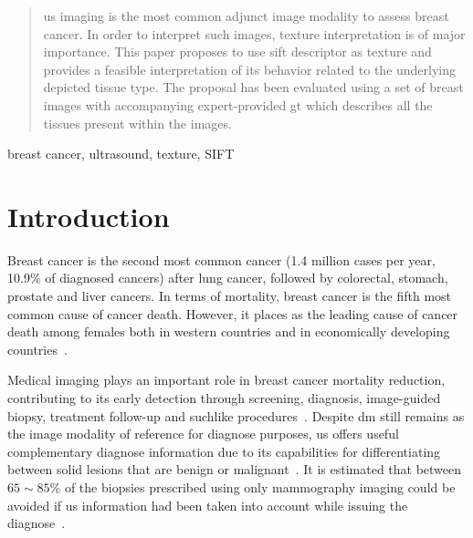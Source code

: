 \documentclass[a4paper, 10pt, conference]{llncs}      %
\begin{document}
\vspace{-5pt}
\begin{abstract}
\ac{us} imaging is the most common adjunct image modality to assess breast cancer. In order to interpret such images, texture interpretation is of major importance. This paper proposes to use \acf{sift} descriptor as texture and provides a feasible interpretation of its behavior related to the underlying depicted tissue type. The proposal has been evaluated using a set of breast images with accompanying expert-provided \acf{gt} which describes all the tissues present within the images.


\end{abstract}
%
\begin{keywords}
breast cancer, ultrasound, texture, SIFT
\end{keywords}
%

\graphicspath{{figures/}}

\section{Introduction}
\label{sec:introduction}
 
Breast cancer is the second most common cancer (1.4 million cases per year, 10.9\% of  diagnosed cancers) after lung cancer, followed by colorectal, stomach, prostate and liver cancers. 
In terms of mortality, breast cancer is the fifth most common cause of cancer death. However, it places as the leading cause of cancer death among females both in western countries and in economically developing countries~\cite{cancerStatistics2011}.

Medical imaging plays an important role in breast cancer mortality reduction, contributing to its early detection through screening, diagnosis, image-guided biopsy, treatment follow-up and suchlike procedures~\cite{smith2003american}.
Despite \ac{dm} still remains as the image modality of reference for diagnose purposes, \ac{us} offers useful complementary  diagnose information due to its capabilities for differentiating between solid lesions that are benign or malignant~\cite{stavros2004breast}. It is estimated that between $65\sim85\%$ of the biopsies prescribed using only mammography imaging could be avoided if \ac{us} information had been taken into account while issuing the diagnose~\cite{yuan2010multimodality}. 
\end{document}
